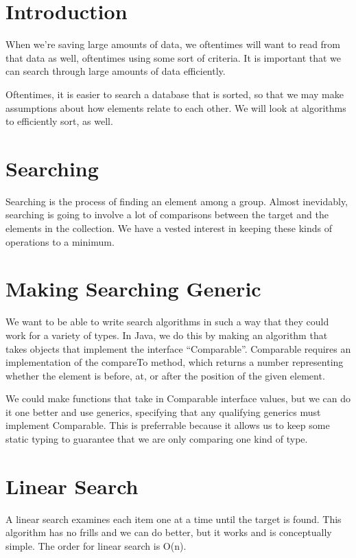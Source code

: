 \documentclass{article}
\begin{document}
\maketitle
\tableofcontents

\section{Introduction}
When we're saving large amounts of data, we oftentimes will want to read from
that data as well, oftentimes using some sort of criteria. It is important that
we can search through large amounts of data efficiently.

Oftentimes, it is easier to search a database that is sorted, so that we may
make assumptions about how elements relate to each other. We will look at
algorithms to efficiently sort, as well.

\section{Searching}
Searching is the process of finding an element among a group. Almost
inevidably, searching is going to involve a lot of comparisons between the
target and the elements in the collection. We have a vested interest in keeping
these kinds of operations to a minimum.

\section{Making Searching Generic}
We want to be able to write search algorithms in such a way that they could
work for a variety of types. In Java, we do this by making an algorithm that
takes objects that implement the interface ``Comparable''. Comparable requires
an implementation of the compareTo method, which returns a number representing
whether the element is before, at, or after the position of the given element.

We could make functions that take in Comparable interface values, but we can do
it one better and use generics, specifying that any qualifying generics must
implement Comparable. This is preferrable because it allows us to keep some
static typing to guarantee that we are only comparing one kind of type.

\section{Linear Search}
A linear search examines each item one at a time until the target is found.
This algorithm has no frills and we can do better, but it works and is
conceptually simple. The order for linear search is O(n).
\end{document}
